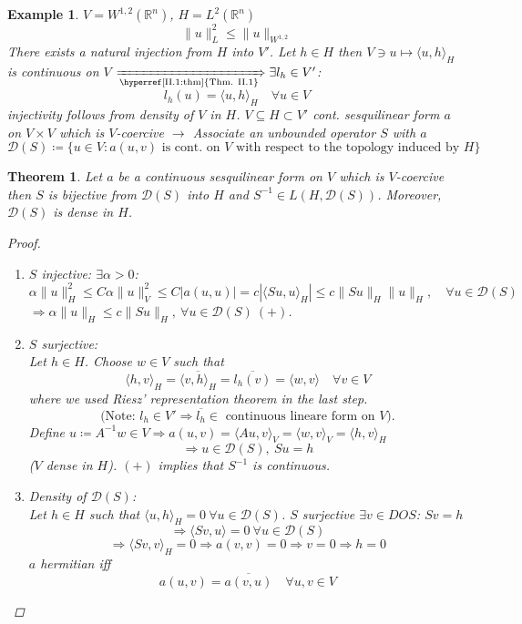 \documentclass[12pt]{extreport} %
\newcommand{\R}{\mathbb{R}}
\newcommand{\DO}[1]{\mathcal{D}\left( {#1} \right)}
\theoremstyle{named}
\theoremstyle{nnamed}
\theoremstyle{itshape}
\newtheorem{theorem}{Theorem}  \counterwithin{theorem}{chapter}
\theoremstyle{normal}
\newtheorem*{example}{Example}
\begin{document}
\begin{example}
	$V = W^{1,2}(\R^n)$, $H = L^2(\R^n)$
 		$$ \| u \|_L^2 \leq \| u \|_{W^{1,2}} $$	
 	There exists a natural injection from $H$ into $V'$. Let $h \in H$ then $V \ni u \mapsto \langle u, h \rangle_H$ is continuous on $V$ $\xRightarrow[\text{\hyperref[II.1:thm]{Thm. II.1}}]{} \exists l_h \in V'$:
 		$$ l_h(u) = \langle u, h \rangle_H \quad \forall u \in V $$
 	injectivity follows from density of $V$ in $H$. $V \subseteq H \subset V'$ cont. sesquilinear form $a$ on $V \times V$ which is $V$-coercive $\rightarrow$ Associate an unbounded operator $S$ with $a$
 		$$ \DO{S} \coloneqq \big\{ u \in V \colon a(u, v) \text{ is cont. on } V \text{ with respect to the topology induced by } H \big\} $$
\end{example}


\begin{theorem} \label{thm:2.3}
	Let $a$ be a continuous sesquilinear form on $V$ which is $V$-coercive then $S$ is bijective from $\DO{S}$ into $H$ and $S^{-1} \in L(H, \DO{S})$. Moreover, $\DO{S}$ is dense in $H$.
	
	\begin{proof} ~\
		\begin{enumerate}[label=\arabic*\upshape)]
			\item $S$ injective: $\exists \alpha > 0$: 
				$$ \alpha \| u \|^2_H \leq C \alpha \| u \|^2_V \leq C \left| a (u,u) \right| = c \left| \langle S u, u \rangle_H \right| \leq c \| Su\|_H \| u \|_H, \quad \forall u \in \DO{S} $$
				$\Rightarrow \alpha \|u\|_H \leq c \| Su\|_H, ~ \forall u \in \DO{S} ~(+)$.
			\item $S$ surjective: ~\\
				Let $h \in H$. Choose $w \in V$ such that
				$$ \langle h, v \rangle_H = \overline{\langle v, h \rangle_H} = \overline{l_h(v)} = \langle w, v \rangle \quad \forall v \in V $$
				where we used Riesz' representation theorem in the last step. 
				$$\text{(Note: $l_h \in V' \Rightarrow \overline{l_h} \in$ continuous lineare form on $V$).} $$ %
				Define $u \coloneqq A^{-1} w \in V \Rightarrow a(u,v) = \langle A u, v \rangle_V = \langle w, v \rangle_V = \langle h, v \rangle_H$
				$$ \Rightarrow u \in \DO{S}, ~Su = h $$
				($V$ dense in $H$). $(+)$ implies that $S^{-1}$ is continuous.
			\item Density of $\DO{S}$: ~\\
				Let $h \in H$ such that $\langle u, h \rangle_H = 0 ~\forall u \in \DO{S}$. $S$ surjective $\exists v \in DO{S}$: $Sv = h$
				$$ \Rightarrow \langle Sv, u \rangle = 0 ~ \forall u \in \DO{S} $$
				$$ \Rightarrow \langle Sv, v \rangle_H = 0 \Rightarrow a(v, v) = 0 \Rightarrow v = 0 \Rightarrow h = 0 $$
				$a$ hermitian iff
				$$ a(u,v) = \overline{a(v, u)} \quad \forall u, v \in V $$
		\end{enumerate}
	\end{proof}	
\end{theorem}
\end{document}
